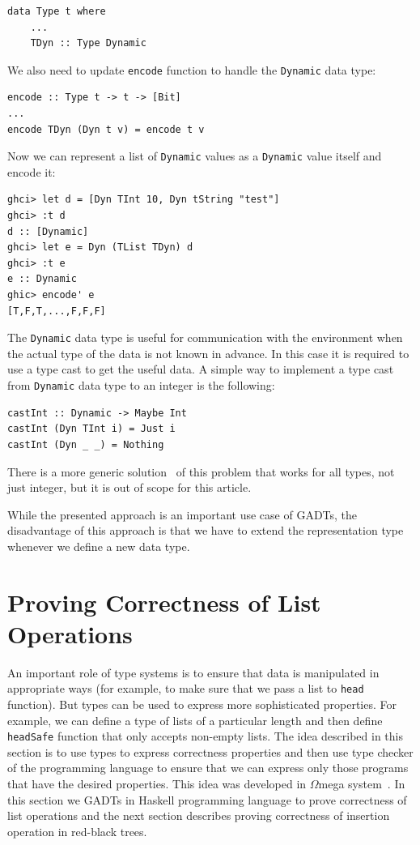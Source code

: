\documentclass{tmr}
\begin{document}
\begin{Verbatim}
data Type t where
    ...
    TDyn :: Type Dynamic
\end{Verbatim}

We also need to update \verb|encode| function to handle the \verb|Dynamic| data type:

\begin{Verbatim}
encode :: Type t -> t -> [Bit]
...
encode TDyn (Dyn t v) = encode t v
\end{Verbatim}

Now we can represent a list of \verb|Dynamic| values as a \verb|Dynamic| value itself and encode it:

\begin{Verbatim}
ghci> let d = [Dyn TInt 10, Dyn tString "test"]
ghci> :t d
d :: [Dynamic]
ghci> let e = Dyn (TList TDyn) d
ghci> :t e
e :: Dynamic
ghic> encode' e
[T,F,T,...,F,F,F]
\end{Verbatim}

The \verb|Dynamic| data type is useful for communication with the environment when the actual type of the data is not known in advance. In this case it is required to use a type cast to get the useful data. A simple way to implement a type cast from \verb|Dynamic| data type to an integer is the following:

\begin{Verbatim}
castInt :: Dynamic -> Maybe Int
castInt (Dyn TInt i) = Just i
castInt (Dyn _ _) = Nothing
\end{Verbatim}

There is a more generic solution~\cite{fun_with_phantom_types} of this problem that works for all types, not just integer, but it is out of scope for this article.

While the presented approach is an important use case of GADTs, the disadvantage of this approach is that we have to extend the representation type whenever we define a new data type.

\section{Proving Correctness of List Operations}
\label{sec:list_operations}

An important role of type systems is to ensure that data is manipulated in appropriate ways (for example, to make sure that we pass a list to \verb|head| function). But types can be used to express more sophisticated properties. For example, we can define a type of lists of a particular length and then define \verb|headSafe| function that only accepts non-empty lists. The idea described in this section is to use types to express correctness properties and then use type checker of the programming language to ensure that we can express only those programs that have the desired properties. This idea was developed in $\Omega$mega system~\cite{curry_howard,omega}. In this section we GADTs in Haskell programming language to prove correctness of list operations and the next section describes proving correctness of insertion operation in red-black trees.
\end{document}
